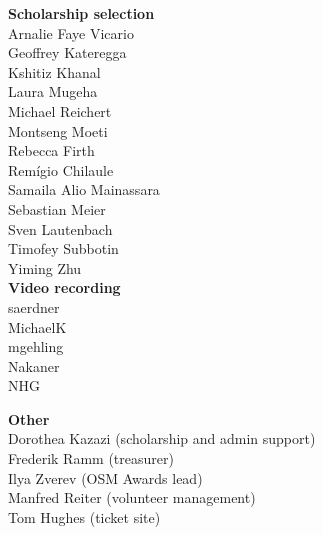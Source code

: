 \begin{multicols}{2}
\begin{small}
    \vspace{\volunteerSpace}
    \textbf{Scholarship selection}\\
    Arnalie Faye Vicario\\
    Geoffrey Kateregga\\
    Kshitiz Khanal\\
    Laura Mugeha\\
    Michael Reichert\\
    Montseng Moeti\\
    Rebecca Firth\\
    Remígio Chilaule\\
    Samaila Alio Mainassara\\
    Sebastian Meier\\
    Sven Lautenbach\\
    Timofey Subbotin\\
    Yiming Zhu\\

    \vspace{\volunteerSpace}
    \textbf{Video recording}\\
    saerdner\\
    MichaelK\\
    mgehling\\
    Nakaner\\
    NHG

    \vspace{\volunteerSpace}
    \textbf{Other}\\
    Dorothea Kazazi (scholarship and admin support)\\
    Frederik Ramm (treasurer)\\
    Ilya Zverev (OSM Awards lead)\\
    Manfred Reiter (volunteer management)\\
    Tom Hughes (ticket site)\\
  \end{small}
\end{multicols}

